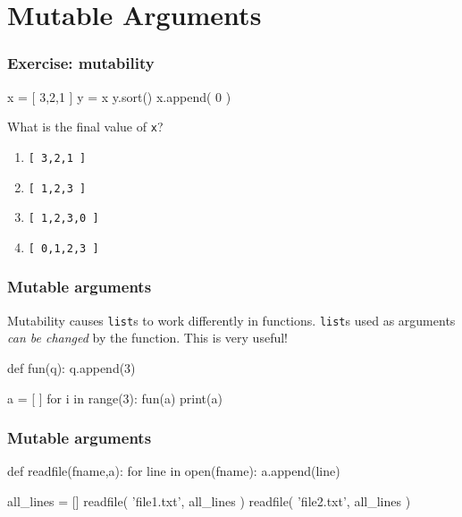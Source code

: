 \documentclass[11pt]{beamer}
\begin{document}
\section{Mutable Arguments}

\begin{frame}[fragile]
  \frametitle{Exercise:  mutability}
  \Enlarge

  \begin{semiverbatim}
x = [ 3,2,1 ]
y = x
y.sort()
x.append( 0 )
  \end{semiverbatim}
  What is the final value of \texttt{x}?
  \begin{enumerate}[label=\Alph*]
  \item  \texttt{[ 3,2,1 ]}
  \item  \texttt{[ 1,2,3 ]}
  \item  \texttt{[ 1,2,3,0 ]}
  \item  \texttt{[ 0,1,2,3 ]}
  \end{enumerate}
\end{frame}

\begin{frame}[fragile]
  \frametitle{Mutable arguments}
  \Enlarge

  \begin{itemize}
  \myitem  Mutability causes \texttt{list}s to work differently in functions.
  \myitem  \texttt{list}s used as arguments \emph{can be changed} by the function.
  \myitem  This is very useful!
  \end{itemize}
  \begin{semiverbatim}
def fun(q):
    q.append(3)

a = [ ]
for i in range(3):
    fun(a)
print(a)
  \end{semiverbatim}
\end{frame}

\begin{frame}[fragile]
  \frametitle{Mutable arguments}
  \Enlarge

  \begin{semiverbatim}
def readfile(fname,a):
    for line in open(fname):
        a.append(line)

all_lines = []
readfile( 'file1.txt', all_lines )
readfile( 'file2.txt', all_lines )
  \end{semiverbatim}
\end{frame}
\end{document}
